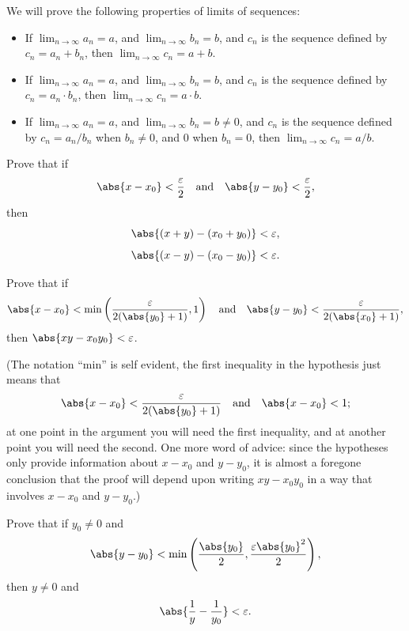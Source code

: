 \begin{exc}

    We will prove the following properties of limits of sequences:
    \begin{itemize}
        \item If $\lim_{n \to \infty} a_n = a$, and $\lim_{n \to \infty} b_n = b$, and $c_n$ is the sequence defined by $c_n = a_n + b_n$, then $\lim_{n \to \infty} c_n = a + b$.
        \item If $\lim_{n \to \infty} a_n = a$, and $\lim_{n \to \infty} b_n = b$, and $c_n$ is the sequence defined by $c_n = a_n \cdot b_n$, then $\lim_{n \to \infty} c_n = a \cdot b$.
        \item If $\lim_{n \to \infty} a_n = a$, and $\lim_{n \to \infty} b_n = b \neq 0$, and $c_n$ is the sequence defined by $c_n = {a_n}/{b_n}$ when $b_n \neq 0$, and $0$ when $b_n = 0$, then $\lim_{n \to \infty} c_n = {a}/{b}$.
    \end{itemize}
    \begin{exercise}
    Prove that if
    \[
    \abs{x - x_0} < \frac{\varepsilon}{2} \quad \text{and} \quad \abs{y - y_0} < \frac{\varepsilon}{2},
    \]
    then
    \[
    \abs{(x+y) - (x_0+y_0)} < \varepsilon,
    \]
    \[
    \abs{(x-y) - (x_0-y_0)} < \varepsilon.
    \]
    \end{exercise}

    \begin{exercise}
    Prove that if
    \[
    \abs{x - x_0} < \min\left( \frac{\varepsilon}{2(\abs{y_0}+1)}, 1 \right)
    \quad \text{and} \quad
    \abs{y - y_0} < \frac{\varepsilon}{2(\abs{x_0}+1)},
    \]
    then $\abs{xy - x_0y_0} < \varepsilon$.

    (The notation ``min'' is self evident, the first inequality in the
    hypothesis just means that
    \[
    \abs{x - x_0} < \frac{\varepsilon}{2(\abs{y_0}+1)} \quad \text{and} \quad \abs{x - x_0} < 1;
    \]
    at one point in the argument you will need the first inequality, and at
    another point you will need the second. One more word of advice: since the
    hypotheses only provide information about $x - x_0$ and $y - y_0$, it is
    almost a foregone conclusion that the proof will depend upon writing $xy -
    x_0y_0$ in a way that involves $x - x_0$ and $y - y_0$.)
    \end{exercise}

    \begin{exercise}
    Prove that if $y_0 \neq 0$ and
    \[
    \abs{y - y_0} < \min\left( \frac{\abs{y_0}}{2}, \frac{\varepsilon\abs{y_0}^2}{2} \right),
    \]
    then $y \neq 0$ and
    \[
    \abs{\frac{1}{y} - \frac{1}{y_0}} < \varepsilon.
    \]
    \end{exercise}


\end{exc}
